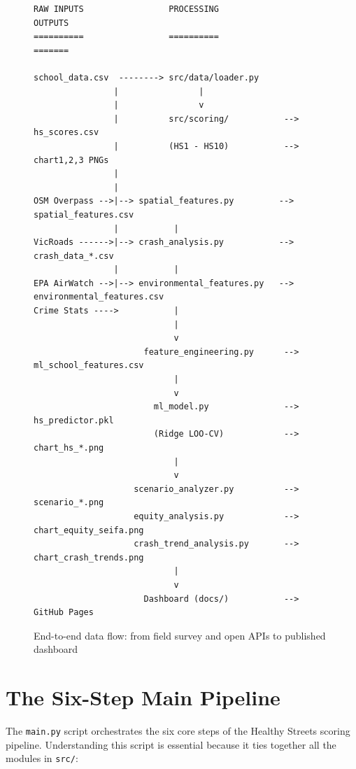 \documentclass[11pt,a4paper,openany]{book}
\begin{document}
\begin{figure}[H]
\centering
\begin{tcolorbox}[colback=white,colframe=navyblue,title=\textbf{Data Flow Diagram},
  fonttitle=\bfseries, width=\textwidth]
\begin{lstlisting}[style=text, frame=none, numbers=none]
RAW INPUTS                 PROCESSING                  OUTPUTS
==========                 ==========                  =======

school_data.csv  --------> src/data/loader.py
                |                |
                |                v
                |          src/scoring/           --> hs_scores.csv
                |          (HS1 - HS10)           --> chart1,2,3 PNGs
                |
                |
OSM Overpass -->|--> spatial_features.py         --> spatial_features.csv
                |           |
VicRoads ------>|--> crash_analysis.py           --> crash_data_*.csv
                |           |
EPA AirWatch -->|--> environmental_features.py   --> environmental_features.csv
Crime Stats ---->           |
                            |
                            v
                      feature_engineering.py      --> ml_school_features.csv
                            |
                            v
                        ml_model.py               --> hs_predictor.pkl
                        (Ridge LOO-CV)            --> chart_hs_*.png
                            |
                            v
                    scenario_analyzer.py          --> scenario_*.png
                    equity_analysis.py            --> chart_equity_seifa.png
                    crash_trend_analysis.py       --> chart_crash_trends.png
                            |
                            v
                      Dashboard (docs/)           --> GitHub Pages
\end{lstlisting}
\end{tcolorbox}
\caption{End-to-end data flow: from field survey and open APIs to published dashboard}
\label{fig:dataflow}
\end{figure}

\section{The Six-Step Main Pipeline}

The \texttt{main.py} script orchestrates the six core steps of the Healthy Streets scoring pipeline. Understanding this script is essential because it ties together all the modules in \texttt{src/}:
\end{document}
